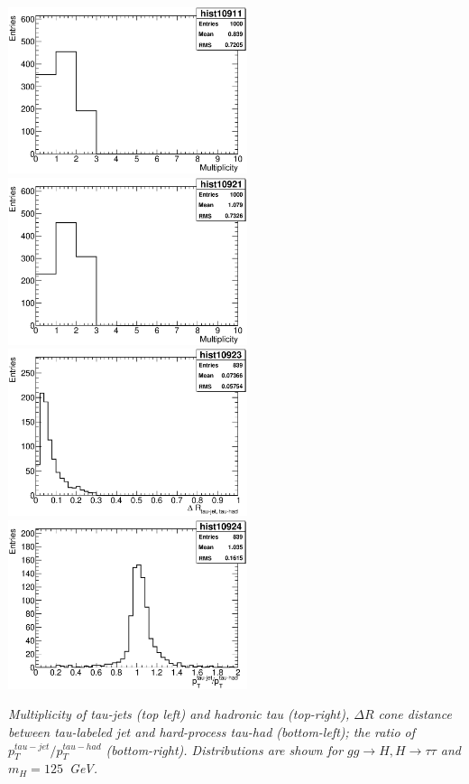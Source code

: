 \newpage
\begin{Fighere}
\begin{center}
{
   \includegraphics[width=7.0cm,angle=0]{plot-multiTauJets.eps}
   \includegraphics[width=7.0cm,angle=0]{plot-multiTauHP.eps}\\
}
{
   \includegraphics[width=7.0cm,angle=0]{plot-dR-jetTauHP.eps}
   \includegraphics[width=7.0cm,angle=0]{plot-dPT-jetTauHP.eps}
}
\end{center}
\caption{\em
Multiplicity of tau-jets (top left) and hadronic tau (top-right),
$\Delta R$ cone distance between tau-labeled jet and hard-process tau-had (bottom-left);
the ratio of $p_T^{tau-jet}/p_T^{tau-had}$ (bottom-right). Distributions are shown
for $gg \to H, H \to \tau \tau$ and  $m_{H} = 125$~GeV.
\label{FS2:5}} 
\end{Fighere}

